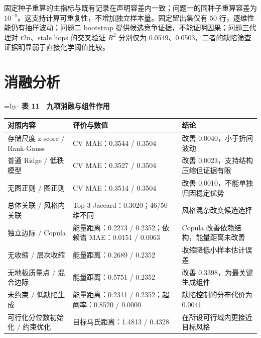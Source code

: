 \documentclass[
  chinese,
  11pt,
]{article}
\makeatletter
\newcounter{none} %
\newcommand{\EnsureSpace}[1]{\par\begingroup\@tempdima=\pagegoal\advance\@tempdima by-\pagetotal\ifdim\@tempdima<#1\newpage\fi\endgroup}
\makeatother
\begin{document}
固定种子重算的主指标与既有记录在声明容差内一致；问题一的同种子重算容差为
\(10^{-9}\)。这支持计算可重复性，不增加独立样本量。固定留出集仅有 50
行，逐维性能仍有抽样波动；问题二 bootstrap
提供候选竞争证据，不能证明因果；问题三代理对 t2n、stale hops 的交叉验证
\(R^2\) 分别仅为
0.0549、0.0503，二者的缺陷筛查证据明显弱于直接化学阈值比较。

\section{消融分析}\label{ux6d88ux878dux5206ux6790}

\EnsureSpace{6\baselineskip}
\textbf{表 11　九项消融与组件作用}

{\def\LTcaptype{none} %
\begin{longtable}[]{@{}
  >{\raggedright\arraybackslash}p{}
  >{\raggedright\arraybackslash}p{}
  >{\raggedright\arraybackslash}p{}@{}}
\toprule\noalign{}
\begin{minipage}[b]{\linewidth}\raggedright
对照内容
\end{minipage} & \begin{minipage}[b]{\linewidth}\raggedright
评价与数值
\end{minipage} & \begin{minipage}[b]{\linewidth}\raggedright
结论
\end{minipage} \\
\midrule\noalign{}
\endhead
\bottomrule\noalign{}
\endlastfoot
存储尺度 z-score / Rank-Gauss & CV MAE：0.3544 / 0.3504 & 改善
0.0040，小于折间波动 \\
普通 Ridge / 低秩模型 & CV MAE：0.3527 / 0.3504 & 改善
0.0023，支持结构压缩但证据有限 \\
无图正则 / 图正则 & CV MAE：0.3514 / 0.3504 & 改善
0.0010，不能单独归因稳定优势 \\
总体关联 / 风格内关联 & Top-3 Jaccard：0.3020；46/50 维不同 &
风格混杂改变候选选择 \\
独立边际 / Copula & 能量距离：0.2273 / 0.2352；依赖谱 MAE：0.0151 /
0.0063 & Copula 改善依赖结构，能量距离未改善 \\
无收缩 / 层次收缩 & 能量距离：0.2689 / 0.2352 &
收缩降低小样本估计误差 \\
无地板质量点 / 混合边际 & 能量距离：0.5751 / 0.2352 & 改善
0.3398，为最关键生成组件 \\
未约束 / 低缺陷生成 & 能量距离：0.2311 / 0.2352；超阈率：0.8520 / 0.0000
& 缺陷控制的分布代价为 0.0041 \\
可行化分位数初始化 / 约束优化 & 目标马氏距离：1.4813 / 0.4328 &
在所设可行域内更接近目标风格 \\
\end{longtable}
}
\end{document}
